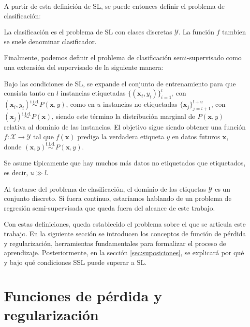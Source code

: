 A partir de esta definición de \gls{SL}, se puede entonces definir el problema de clasificación:

\begin{defi}[Clasificación]
La clasificación es el problema de \gls{SL} con clases discretas $\mathcal{Y}$. La función $f$ tambien se suele denominar clasificador.
\end{defi}

Finalmente, podemos definir el problema de clasificación semi-supervisado como una extensión del supervisado de la siguiente manera:

\begin{defi}
Bajo las condiciones de \gls{SL}, se expande el conjunto de entrenamiento para que consista tanto en $l$ instancias etiquetadas $\{(\mathbf{x}_i, y_i)\}_{i=1}^l$, con $(\mathbf{x}_i, y_i) \overset{\text{i.i.d.}}{\sim} P(\mathbf{x},y)$,  como en $u$ instancias no etiquetadas $\{\mathbf{x}_j\}_{j=l+1}^{l+u}$, con $(\mathbf{x}_j) \overset{\text{i.i.d.}}{\sim} P(\mathbf{x})$, siendo este término la distribución marginal de $P(\mathbf{x},y)$ relativa al dominio de las instancias. El objetivo sigue siendo obtener una función $f : \mathcal{X} \to \mathcal{Y}$ tal que $f(\mathbf{x})$ prediga la verdadera etiqueta $y$ en datos futuros $\mathbf{x}$, donde $(\mathbf{x},y) \overset{\text{i.i.d.}}{\sim} P(\mathbf{x},y)$.
\end{defi}

\begin{rema}
Se asume típicamente que hay muchos más datos no etiquetados que etiquetados, es decir, $u \gg l$.     
\end{rema}

\begin{rema}
Al tratarse del problema de clasificación, el dominio de las etiquetas $\mathcal{Y}$ es un conjunto discreto. Si fuera continuo, estaríamos hablando de un problema de regresión semi-supervisada que queda fuera del alcance de este trabajo.
\end{rema}

Con estas definiciones, queda establecido el problema sobre el que se articula este trabajo. En la siguiente sección se introducen los conceptos de función de pérdida y regularización, herramientas fundamentales para formalizar el proceso de aprendizaje. Posteriormente, en la sección \ref{sec:suposiciones}, se explicará por qué y bajo qué condiciones \gls{SSL} puede superar a \gls{SL}.

\section{Funciones de pérdida y regularización}
\label{sec:perdida_regularizacion}

